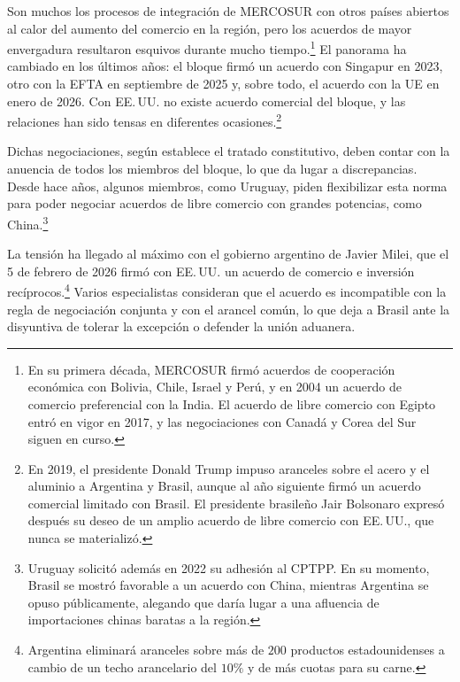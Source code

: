 \documentclass[10pt,a4paper]{article}
\begin{document}
Son muchos los procesos de integración de MERCOSUR con otros países abiertos al calor del aumento del comercio en la región, pero los acuerdos de mayor envergadura resultaron esquivos durante mucho tiempo.\footnote{%
    En su primera década, MERCOSUR firmó acuerdos de cooperación económica con Bolivia, Chile, Israel y Perú, y en 2004 un acuerdo de comercio preferencial con la India. El acuerdo de libre comercio con Egipto entró en vigor en 2017, y las negociaciones con Canadá y Corea del Sur siguen en curso.
} El panorama ha cambiado en los últimos años: el bloque firmó un acuerdo con Singapur en 2023, otro con la EFTA en septiembre de 2025 y, sobre todo, el acuerdo con la UE en enero de 2026. Con EE.\,UU. no existe acuerdo comercial del bloque, y las relaciones han sido tensas en diferentes ocasiones.\footnote{%
    En 2019, el presidente Donald Trump impuso aranceles sobre el acero y el aluminio a Argentina y Brasil, aunque al año siguiente firmó un acuerdo comercial limitado con Brasil. El presidente brasileño Jair Bolsonaro expresó después su deseo de un amplio acuerdo de libre comercio con EE.\,UU., que nunca se materializó.
}

Dichas negociaciones, según establece el tratado constitutivo, deben contar con la anuencia de todos los miembros del bloque, lo que da lugar a discrepancias. Desde hace años, algunos miembros, como Uruguay, piden flexibilizar esta norma para poder negociar acuerdos de libre comercio con grandes potencias, como China.\footnote{%
    Uruguay solicitó además en 2022 su adhesión al CPTPP. En su momento, Brasil se mostró favorable a un acuerdo con China, mientras Argentina se opuso públicamente, alegando que daría lugar a una afluencia de importaciones chinas baratas a la región.
} 

La tensión ha llegado al máximo con el gobierno argentino de Javier Milei, que el 5 de febrero de 2026 firmó con EE.\,UU. un acuerdo de comercio e inversión recíprocos.\footnote{%
    Argentina eliminará aranceles sobre más de $200$ productos estadounidenses a cambio de un techo arancelario del $10\%$ y de más cuotas para su carne.
} Varios especialistas consideran que el acuerdo es incompatible con la regla de negociación conjunta y con el arancel común, lo que deja a Brasil ante la disyuntiva de tolerar la excepción o defender la unión aduanera.
\end{document}
